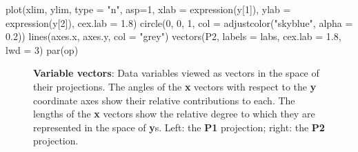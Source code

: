 \documentclass[
  letterpaper,
  10pt,
  krantz2]{krantz}
\makeatletter
\newenvironment{Shaded}{\begin{snugshade}}{\end{snugshade}}
\newcommand{\AttributeTok}[1]{\textcolor[rgb]{0.40,0.45,0.13}{#1}}
\newcommand{\DecValTok}[1]{\textcolor[rgb]{0.68,0.00,0.00}{#1}}
\newcommand{\FloatTok}[1]{\textcolor[rgb]{0.68,0.00,0.00}{#1}}
\newcommand{\FunctionTok}[1]{\textcolor[rgb]{0.28,0.35,0.67}{#1}}
\newcommand{\NormalTok}[1]{\textcolor[rgb]{0.00,0.23,0.31}{#1}}
\newcommand{\StringTok}[1]{\textcolor[rgb]{0.13,0.47,0.30}{#1}}
\newenvironment{kframe}{%
  \medskip{}
  \setlength{\fboxsep}{.8em}
  \def\at@end@of@kframe{}%
  \ifinner\ifhmode%
  \def\at@end@of@kframe{\end{minipage}}%
  \begin{minipage}{\columnwidth}%
  \fi\fi%
  \def\FrameCommand##1{\hskip\@totalleftmargin \hskip-\fboxsep
  \colorbox{shadecolor}{##1}\hskip-\fboxsep
      \hskip-\linewidth \hskip-\@totalleftmargin \hskip\columnwidth}%
  \MakeFramed {\advance\hsize-\width
    \@totalleftmargin\z@ \linewidth\hsize
    \@setminipage}}%
{\par\unskip\endMakeFramed%
  \at@end@of@kframe}
\renewenvironment{Shaded}{\begin{kframe}}{\end{kframe}}
\makeatother
\begin{document}
\begin{Shaded}
\begin{Highlighting}[]
\FunctionTok{plot}\NormalTok{(xlim, ylim, }\AttributeTok{type =} \StringTok{"n"}\NormalTok{, }\AttributeTok{asp=}\DecValTok{1}\NormalTok{,}
     \AttributeTok{xlab =} \FunctionTok{expression}\NormalTok{(y[}\DecValTok{1}\NormalTok{]), }\AttributeTok{ylab =} \FunctionTok{expression}\NormalTok{(y[}\DecValTok{2}\NormalTok{]),}
     \AttributeTok{cex.lab =} \FloatTok{1.8}\NormalTok{)}
\FunctionTok{circle}\NormalTok{(}\DecValTok{0}\NormalTok{, }\DecValTok{0}\NormalTok{, }\DecValTok{1}\NormalTok{, }\AttributeTok{col =} \FunctionTok{adjustcolor}\NormalTok{(}\StringTok{"skyblue"}\NormalTok{, }\AttributeTok{alpha =} \FloatTok{0.2}\NormalTok{))}
\FunctionTok{lines}\NormalTok{(axes.x, axes.y, }\AttributeTok{col =} \StringTok{"grey"}\NormalTok{)}
\FunctionTok{vectors}\NormalTok{(P2, }\AttributeTok{labels =}\NormalTok{ labs, }\AttributeTok{cex.lab =} \FloatTok{1.8}\NormalTok{, }\AttributeTok{lwd =} \DecValTok{3}\NormalTok{)}
\FunctionTok{par}\NormalTok{(op)}
\end{Highlighting}
\end{Shaded}

\begin{figure}

\end{figure}%

\begin{figure}


\caption{\label{fig-proj-vectors}\textbf{Variable vectors}: Data
variables viewed as vectors in the space of their projections. The
angles of the \textbf{x} vectors with respect to the \textbf{y}
coordinate axes show their relative contributions to each. The lengths
of the \textbf{x} vectors show the relative degree to which they are
represented in the space of \textbf{y}s. Left: the \textbf{P1}
projection; right: the \textbf{P2} projection.}

\end{figure}%
\end{document}
